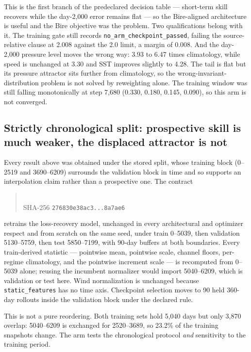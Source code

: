 \documentclass[11pt]{article}
\begin{document}
This is the first branch of the predeclared decision table --- short-term skill recovers
while the day-2,000 error remains flat --- so the Bire-aligned architecture is useful and
the Bire objective was the problem.  Two qualifications belong with it.  The training
gate still records \texttt{no\_arm\_checkpoint\_passed}, failing the source-relative
clause at 2.008 against the 2.0 limit, a margin of 0.008.  And the day-2,000 pressure
level moves the wrong way: 3.93 to 6.47 times climatology, while speed is unchanged at
3.30 and SST improves slightly to 4.28.  The tail is flat but its pressure attractor sits
further from climatology, so the wrong-invariant-distribution problem is not solved by
reweighting alone.  The training window was still falling monotonically at step 7,680
(0.330, 0.180, 0.145, 0.090), so this arm is not converged.

\subsection{Strictly chronological split: prospective skill is much weaker, the
displaced attractor is not}

Every result above was obtained under the stored split, whose training block
(0--2519 and 3690--6209) surrounds the validation block in time and so supports an
interpolation claim rather than a prospective one.  The contract
\begin{quote}
\\
SHA-256 \texttt{276830e38ac3...8a7ae6}
\end{quote}
retrains the loss-recovery model, unchanged in every architectural and optimizer
respect and from scratch on the same seed, under train 0--5039, then validation 5130--5759, then test 5850--7199,
with 90-day buffers at both boundaries.  Every train-derived statistic ---
pointwise mean, pointwise scale, channel floors, per-regime climatology, and the
pointwise increment scale --- is recomputed from 0--5039 alone; reusing the
incumbent normalizer would import 5040--6209, which is validation or test here.
Wind normalization is unchanged because \texttt{static\_features} has no time
axis.  Checkpoint selection moves to 90 held 360-day rollouts inside the
validation block under the declared rule.

This is not a pure reordering.  Both training sets hold 5,040 days but only 3,870
overlap: 5040--6209 is exchanged for 2520--3689, so 23.2\% of the training
snapshots change.  The arm tests the chronological protocol \emph{and}
sensitivity to the training period.
\end{document}
